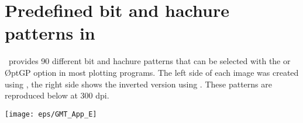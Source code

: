 %
%
\chapter{Predefined bit and hachure patterns in \gmt}
\thispagestyle{headings}

\GMT\ provides 90 different bit and hachure patterns that can be
selected with the  or \O pt{GP} option in most plotting programs.
The left side of each image was created using , the right side
shows the inverted version using .
These patterns are reproduced below at 300 dpi.

\begin{center}
\texttt{[image: eps/GMT\_App\_E]}
\end{center}

